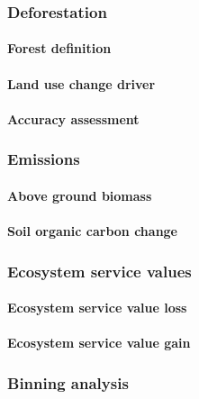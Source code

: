 \subsubsection{Deforestation}
\paragraph{Forest definition}
\paragraph{Land use change driver}
\paragraph{Accuracy assessment}
\subsubsection{Emissions}
\paragraph{Above ground biomass}
\paragraph{Soil organic carbon change}
\subsubsection{Ecosystem service values}
\paragraph{Ecosystem service value loss}
\paragraph{Ecosystem service value gain}
\subsubsection{Binning analysis}